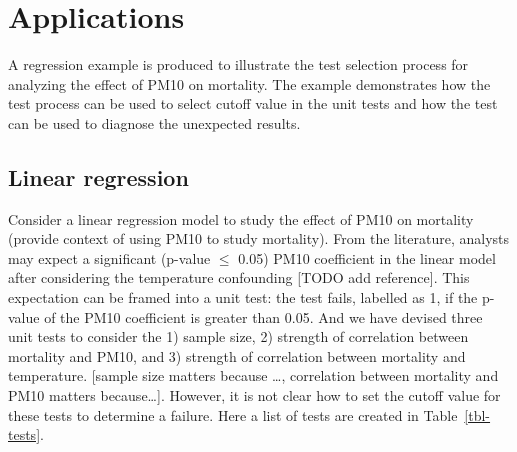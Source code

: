 \documentclass[
]{jds}
\begin{document}
\section{Applications}\label{sec-examples}

A regression example is produced to illustrate the test selection
process for analyzing the effect of PM10 on mortality. The example
demonstrates how the test process can be used to select cutoff value in
the unit tests and how the test can be used to diagnose the unexpected
results.

\subsection{Linear regression}\label{sec-linear-reg}

Consider a linear regression model to study the effect of PM10 on
mortality (provide context of using PM10 to study mortality). From the
literature, analysts may expect a significant (p-value \(\le\) 0.05)
PM10 coefficient in the linear model after considering the temperature
confounding {[}TODO add reference{]}. This expectation can be framed
into a unit test: the test fails, labelled as 1, if the p-value of the
PM10 coefficient is greater than 0.05. And we have devised three unit
tests to consider the 1) sample size, 2) strength of correlation between
mortality and PM10, and 3) strength of correlation between mortality and
temperature. {[}sample size matters because \ldots, correlation between
mortality and PM10 matters because\ldots{]}. However, it is not clear
how to set the cutoff value for these tests to determine a failure. Here
a list of tests are created in Table~\ref{tbl-tests}.
\end{document}
